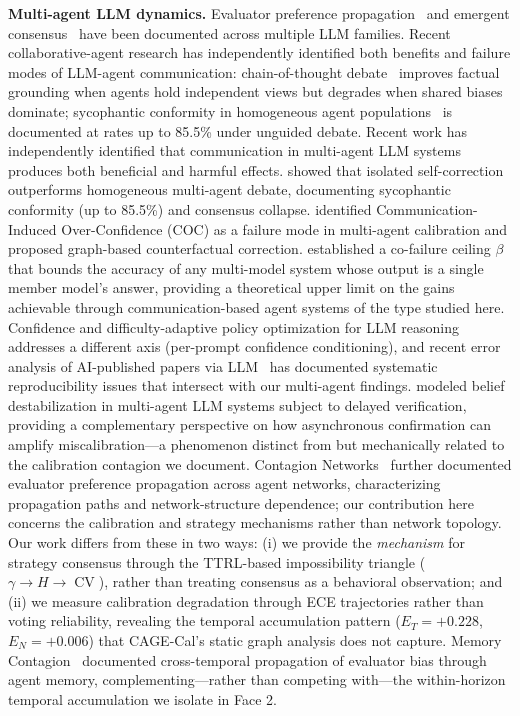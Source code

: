 \documentclass[11pt]{article}
\DeclareMathOperator{\CV}{CV}
\begin{document}
\textbf{Multi-agent LLM dynamics.} Evaluator preference propagation~\cite{mmepc2026} and emergent consensus~\cite{park2023generative} have been documented across multiple LLM families. Recent collaborative-agent research has independently identified both benefits and failure modes of LLM-agent communication: chain-of-thought debate~\cite{du2024improving,li2023camel} improves factual grounding when agents hold independent views but degrades when shared biases dominate; sycophantic conformity in homogeneous agent populations~\cite{bertalanic2026cost} is documented at rates up to 85.5\% under unguided debate. Recent work has independently identified that communication in multi-agent LLM systems produces both beneficial and harmful effects. \citet{bertalanic2026cost} showed that isolated self-correction outperforms homogeneous multi-agent debate, documenting sycophantic conformity (up to 85.5\%) and consensus collapse. \citet{huang2026cagecal} identified Communication-Induced Over-Confidence (COC) as a failure mode in multi-agent calibration and proposed graph-based counterfactual correction. \citet{chen2026combining} established a co-failure ceiling $\beta$ that bounds the accuracy of any multi-model system whose output is a single member model's answer, providing a theoretical upper limit on the gains achievable through communication-based agent systems of the type studied here. Confidence and difficulty-adaptive policy optimization for LLM reasoning~\cite{tmlr260607950} addresses a different axis (per-prompt confidence conditioning), and recent error analysis of AI-published papers via LLM~\cite{tmlr251205925} has documented systematic reproducibility issues that intersect with our multi-agent findings. \citet{itkin2026delayed} modeled belief destabilization in multi-agent LLM systems subject to delayed verification, providing a complementary perspective on how asynchronous confirmation can amplify miscalibration---a phenomenon distinct from but mechanically related to the calibration contagion we document. Contagion Networks~\citep{contagionnetworks2026} further documented evaluator preference propagation across agent networks, characterizing propagation paths and network-structure dependence; our contribution here concerns the calibration and strategy mechanisms rather than network topology. Our work differs from these in two ways: (i) we provide the \textit{mechanism} for strategy consensus through the TTRL-based impossibility triangle ($\gamma \to H \to \CV$), rather than treating consensus as a behavioral observation; and (ii) we measure calibration degradation through ECE trajectories rather than voting reliability, revealing the temporal accumulation pattern ($E_T = +0.228$, $E_N = +0.006$) that CAGE-Cal's static graph analysis does not capture. Memory Contagion~\citep{liu2025memory} documented cross-temporal propagation of evaluator bias through agent memory, complementing---rather than competing with---the within-horizon temporal accumulation we isolate in Face 2.
\end{document}
